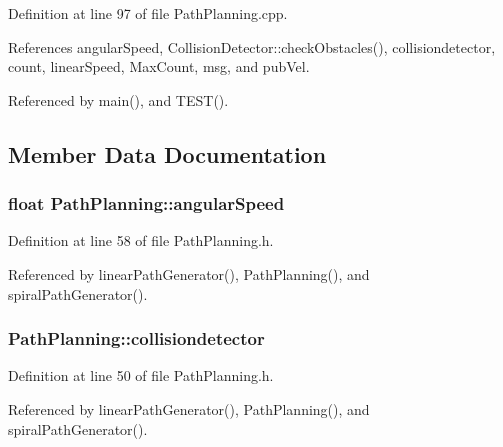 Definition at line 97 of file Path\+Planning.\+cpp.



References angular\+Speed, Collision\+Detector\+::check\+Obstacles(), collisiondetector, count, linear\+Speed, Max\+Count, msg, and pub\+Vel.



Referenced by main(), and T\+E\+S\+T().



\subsection{Member Data Documentation}
\subsubsection[{\texorpdfstring{angular\+Speed}{angularSpeed}}]{\setlength{\rightskip}{0pt plus 5cm}float Path\+Planning\+::angular\+Speed\hspace{0.3cm}{\ttfamily [private]}}\hypertarget{classPathPlanning_aaa87b2917fd4cc8705601b037458dbec}{}\label{classPathPlanning_aaa87b2917fd4cc8705601b037458dbec}


Definition at line 58 of file Path\+Planning.\+h.



Referenced by linear\+Path\+Generator(), Path\+Planning(), and spiral\+Path\+Generator().

\subsubsection[{\texorpdfstring{collisiondetector}{collisiondetector}}]{ Path\+Planning\+::collisiondetector\hspace{0.3cm}{\ttfamily [private]}}\hypertarget{classPathPlanning_a698ed28a6ed1408f311af37170a180a2}{}\label{classPathPlanning_a698ed28a6ed1408f311af37170a180a2}


Definition at line 50 of file Path\+Planning.\+h.



Referenced by linear\+Path\+Generator(), Path\+Planning(), and spiral\+Path\+Generator().

